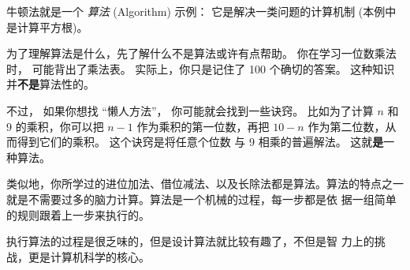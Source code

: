 牛顿法就是一个 {\em 算法} (Algorithm) 示例： 它是解决一类问题的计算机制 (本例中是计算平方根)。


为了理解算法是什么，先了解什么不是算法或许有点帮助。 你在学习一位数乘法时，
可能背出了乘法表。 实际上，你只是记住了 100 个确切的答案。 这种知识并{\bf 不是}算法性的。


不过， 如果你想找 ``懒人方法''， 你可能就会找到一些诀窍。 比如为了计算 $n$
和 $9$ 的乘积，你可以把 $n-1$ 作为乘积的第一位数，再把 $10-n$
作为第二位数，从而得到它们的乘积。 这个诀窍是将任意个位数
与 $9$ 相乘的普遍解法。 这就{\bf 是}一种算法。
  
  


类似地，你所学过的进位加法、借位减法、以及长除法都是算法。算法的特点之一
就是不需要过多的脑力计算。算法是一个机械的过程，每一步都是依
据一组简单的规则跟着上一步来执行的。


执行算法的过程是很乏味的，但是设计算法就比较有趣了，不但是智
力上的挑战，更是计算机科学的核心。


